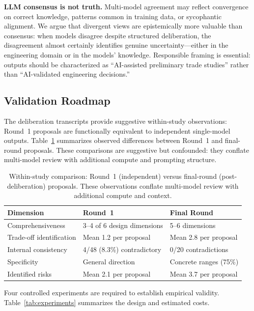 \documentclass[11pt,a4paper]{article}
\begin{document}
\textbf{LLM consensus is not truth.} Multi-model agreement may reflect convergence on correct knowledge, patterns common in training data, or sycophantic alignment. We argue that divergent views are epistemically more valuable than consensus: when models disagree despite structured deliberation, the disagreement almost certainly identifies genuine uncertainty---either in the engineering domain or in the models' knowledge. Responsible framing is essential: outputs should be characterized as ``AI-assisted preliminary trade studies'' rather than ``AI-validated engineering decisions.''

\subsection{Validation Roadmap}
\label{sec:validation_roadmap}

The deliberation transcripts provide suggestive within-study observations: Round~1 proposals are functionally equivalent to independent single-model outputs. Table~\ref{tab:baseline_comparison} summarizes observed differences between Round~1 and final-round proposals. These comparisons are suggestive but confounded: they conflate multi-model review with additional compute and prompting structure.

\begin{table}[ht]
\centering
\caption{Within-study comparison: Round~1 (independent) versus final-round (post-deliberation) proposals. These observations conflate multi-model review with additional compute and context.}
\label{tab:baseline_comparison}
\begin{tabular}{@{}p{3.2cm}p{4.5cm}p{4.5cm}@{}}
\toprule
\textbf{Dimension} & \textbf{Round~1} & \textbf{Final Round} \\
\midrule
Comprehensiveness & 3--4 of 6 design dimensions & 5--6 dimensions \\
Trade-off identification & Mean 1.2 per proposal & Mean 2.8 per proposal \\
Internal consistency & 4/48 (8.3\%) contradictory & 0/20 contradictions \\
Specificity & General direction & Concrete ranges (75\%) \\
Identified risks & Mean 2.1 per proposal & Mean 3.7 per proposal \\
\bottomrule
\end{tabular}
\end{table}

Four controlled experiments are required to establish empirical validity. Table~\ref{tab:experiments} summarizes the design and estimated costs.
\end{document}
